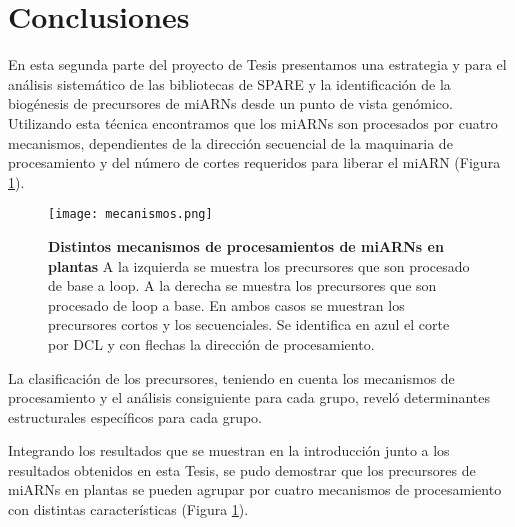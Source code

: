 \section{Conclusiones}

En esta segunda parte del proyecto de Tesis presentamos una estrategia y para el análisis sistemático de las bibliotecas de SPARE y la identificación de la biogénesis de precursores de miARNs desde un punto de vista genómico.
Utilizando esta técnica encontramos que los miARNs son procesados por cuatro mecanismos, dependientes de la dirección secuencial de la maquinaria de procesamiento y del número de cortes requeridos para liberar el miARN (Figura \ref{fig:mecanismos}).

\begin{figure}[htbp!] 
    \centering    
    \texttt{[image: mecanismos.png]}
    \caption[Mecanismos de procesamiento]{
    \textbf{Distintos mecanismos de procesamientos de miARNs en plantas}
    A la izquierda se muestra los precursores que son procesado de base a loop.
    A la derecha se muestra los precursores que son procesado de loop a base.
    En ambos casos se muestran los precursores cortos y los secuenciales.
    Se identifica en azul el corte por DCL y con flechas la dirección de procesamiento.
        }
    \label{fig:mecanismos}
\end{figure}

La clasificación de los precursores, teniendo en cuenta los mecanismos de procesamiento y el análisis consiguiente para cada grupo, reveló determinantes estructurales específicos para cada grupo.

Integrando los resultados que se muestran en la introducción junto a los resultados obtenidos en esta Tesis, se pudo demostrar que los precursores de miARNs en plantas se pueden agrupar por cuatro mecanismos de procesamiento con distintas características (Figura \ref{fig:mecanismos}).

